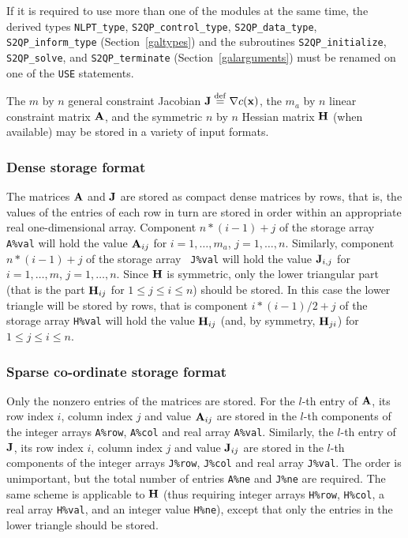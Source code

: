 \documentclass{galahad}
\newcommand{\Grad}{\nabla}
\begin{document}

\galhowto



\noindent
If it is required to use more than one of the modules at the same time, 
the derived types
{\tt NLPT\_type}, {\tt S2QP\_control\_type}, {\tt S2QP\_data\_type}, 
{\tt S2QP\_inform\_type} (Section~\ref{galtypes})
and the subroutines {\tt S2QP\_initialize}, {\tt S2QP\_solve}, and
{\tt S2QP\_terminate} (Section~\ref{galarguments}) must be renamed on
one of the {\tt USE} statements.


\galmatrix The $m$ by $n$ general constraint Jacobian $\bmJ \eqdef
\Grad c(\bmx)$, the $m_a$ by $n$ linear constraint matrix ${\mathbf{A}}$, and
the symmetric $n$ by $n$ Hessian matrix ${\mathbf{H}}$ (when available) may
be stored in a variety of input formats.

\subsubsection{Dense storage format}\label{dense}
The matrices ${\mathbf{A}}$ and ${\mathbf{J}}$ are stored as compact dense matrices by
rows, that is, the values of the entries of each row in turn are
stored in order within an appropriate real one-dimensional array.
Component $n \ast (i-1) + j$ of the storage array {\tt A\%val} will
hold the value ${\mathbf{A}}_{ij}$ for $i = 1, \ldots , m_a$, $j = 1, \ldots ,
n$.  Similarly, component $n \ast (i-1) + j$ of the storage array {\tt
  J\%val} will hold the value ${\mathbf{J}}_{i,j}$ for $i = 1, \ldots , m$, $j =
1, \ldots , n$.  Since ${\mathbf{H}}$ is symmetric, only the lower triangular
part (that is the part ${\mathbf{H}}_{ij}$ for $1 \leq j \leq i \leq n$)
should be stored. In this case the lower triangle will be stored by rows, that is
component $i \ast (i-1)/2 + j$ of the storage array {\tt H\%val} will
hold the value ${\mathbf{H}}_{ij}$ (and, by symmetry, ${\mathbf{H}}_{ji}$) for $1 \leq j
\leq i \leq n$.

\subsubsection{Sparse co-ordinate storage format}\label{coordinate}
Only the nonzero entries of the matrices are stored. For the $l$-th
entry of ${\mathbf{A}}$, its row index $i$, column index $j$ and value
${\mathbf{A}}_{ij}$ are stored in the $l$-th components of the integer arrays
{\tt A\%row}, {\tt A\%col} and real array {\tt A\%val}.  Similarly,
the $l$-th entry of ${\mathbf{J}}$, its row index $i$, column index $j$ and
value ${\mathbf{J}}_{ij}$ are stored in the $l$-th components of the integer
arrays {\tt J\%row}, {\tt J\%col} and real array {\tt J\%val}.  The
order is unimportant, but the total number of entries {\tt A\%ne} and
{\tt J\%ne} are required.  The same scheme is applicable to ${\mathbf{H}}$
(thus requiring integer arrays {\tt H\%row}, {\tt H\%col}, a real
array {\tt H\%val}, and an integer value {\tt H\%ne}), except that only
the entries in the lower triangle should be stored.
\end{document}
